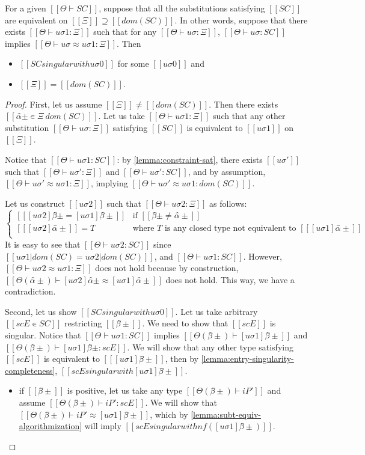 \begin{lemma}
    \label{lemma:singularity-completeness}
    For a given $[[Θ ⊢ SC]]$,
    suppose that all the substitutions satisfying $[[SC]]$ are equivalent
    on $[[Ξ]] \supseteq [[dom(SC)]]$.
    In other words, suppose that there exists $[[Θ ⊢ uσ1 : Ξ]]$ such that
    for any $[[Θ ⊢ uσ : Ξ]]$, $[[Θ ⊢ uσ : SC]]$ implies 
    $[[Θ ⊢ uσ ≈ uσ1 : Ξ]]$.
    Then 
    \begin{itemize}
        \item $[[SC singular with uσ0]]$ for some $[[uσ0]]$ and
        \item $[[Ξ]] = [[dom(SC)]]$.
    \end{itemize} 
\end{lemma}
\begin{proof}

    First, let us assume $[[Ξ]] \neq [[dom(SC)]]$. 
    Then there exists $[[α̂± ∊ Ξ \ dom(SC)]]$.
    Let us take $[[Θ ⊢ uσ1 : Ξ]]$ such that 
    any other substitution $[[Θ ⊢ uσ : Ξ]]$ satisfying $[[SC]]$
    is equivalent to $[[uσ1]]$ on $[[Ξ]]$.

    Notice that $[[Θ ⊢ uσ1 : SC]]$: 
    by \cref{lemma:constraint-sat}, there exists $[[uσ']]$
    such that $[[Θ ⊢ uσ' : Ξ]]$ and $[[Θ ⊢ uσ' : SC]]$,
    and by assumption, $[[Θ ⊢ uσ' ≈ uσ1 : Ξ]]$,
    implying  $[[Θ ⊢ uσ' ≈ uσ1 : dom(SC)]]$.

    Let us construct $[[uσ2]]$ such that $[[Θ ⊢ uσ2 : Ξ]]$ as
    follows:
    $$
    \begin{cases}
        [[ [uσ2]β̂± = [uσ1]β̂±  ]] & \text{if } [[β̂± ≠ α̂±]] \\
        [[ [uσ2]α̂± ]] = T & \text{where $T$ is any closed type not equivalent to $[[ [uσ1]α̂± ]]$} \\
    \end{cases}
    $$
    It is easy to see that $[[Θ ⊢ uσ2 : SC]]$ since
    $[[uσ1|dom(SC) = uσ2|dom(SC)]]$, and $[[Θ ⊢ uσ1 : SC]]$.
    However, $[[Θ ⊢ uσ2 ≈ uσ1 : Ξ]]$ does not hold because
    by construction, $[[Θ(α̂±) ⊢ [uσ2]α̂± ≈ [uσ1]α̂±]]$ does not hold. 
    This way, we have a contradiction.

    Second, let us show $[[SC singular with uσ0]]$.
    Let us take arbitrary $[[scE ∊ SC]]$ restricting $[[β̂±]]$.
    We need to show that $[[scE]]$ is singular.
    Notice that $[[Θ ⊢ uσ1 : SC]]$ implies $[[Θ(β̂±) ⊢ [uσ1]β̂±]]$ and $[[Θ(β̂±) ⊢ [uσ1]β̂± : scE ]]$.
    We will show that any other type satisfying $[[scE]]$ is equivalent to $[[ [uσ1]β̂± ]]$,
    then by \cref{lemma:entry-singularity-completeness}, $[[scE singular with [uσ1]β̂± ]]$.
    \begin{itemize}
        \item if $[[β̂±]]$ is positive, 
            let us take any type $[[Θ(β̂±) ⊢ iP']]$
            and assume $[[Θ(β̂±) ⊢ iP' : scE]]$.
            We will show that $[[Θ(β̂±) ⊢ iP' ≈ [uσ1]β̂±]]$,
            which by \cref{lemma:subt-equiv-algorithmization} will
            imply $[[scE singular with nf([uσ1]β̂±)]]$.


\end{itemize}
\end{proof}
